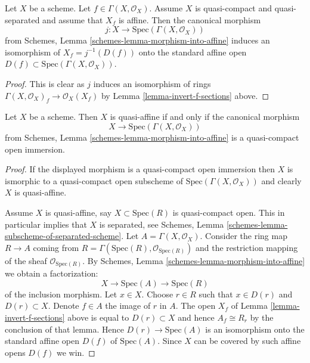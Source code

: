\begin{lemma}
\label{lemma-invert-f-affine}
Let $X$ be a scheme. Let $f \in \Gamma(X, \mathcal{O}_X)$.
Assume $X$ is quasi-compact and quasi-separated and assume that
$X_f$ is affine. Then the canonical morphism
$$
j : X \longrightarrow \text{Spec}(\Gamma(X, \mathcal{O}_X))
$$
from Schemes, Lemma \ref{schemes-lemma-morphism-into-affine}
induces an isomorphism of $X_f = j^{-1}(D(f))$ onto the standard affine
open $D(f) \subset \text{Spec}(\Gamma(X, \mathcal{O}_X))$.
\end{lemma}

\begin{proof}
This is clear as $j$ induces an isomorphism of rings
$\Gamma(X, \mathcal{O}_X)_f \to \mathcal{O}_X(X_f)$ by
Lemma \ref{lemma-invert-f-sections} above.
\end{proof}

\begin{lemma}
\label{lemma-quasi-affine}
Let $X$ be a scheme. Then $X$ is quasi-affine if and only if
the canonical morphism
$$
X \longrightarrow \text{Spec}(\Gamma(X, \mathcal{O}_X))
$$
from Schemes, Lemma \ref{schemes-lemma-morphism-into-affine} is
a quasi-compact open immersion.
\end{lemma}

\begin{proof}
If the displayed morphism is a quasi-compact open immersion then
$X$ is ismorphic to a quasi-compact open subscheme of
$\text{Spec}(\Gamma(X, \mathcal{O}_X))$ and clearly $X$ is quasi-affine.

\medskip\noindent
Assume $X$ is quasi-affine, say $X \subset \text{Spec}(R)$ is
quasi-compact open. This in particular implies that $X$ is
separated, see
Schemes, Lemma \ref{schemes-lemma-subscheme-of-separated-scheme}.
Let $A = \Gamma(X, \mathcal{O}_X)$.
Consider the ring map $R \to A$ coming from
$R = \Gamma(\text{Spec}(R), \mathcal{O}_{\text{Spec}(R)})$
and the restriction mapping of the sheaf $\mathcal{O}_{\text{Spec}(R)}$.
By Schemes, Lemma \ref{schemes-lemma-morphism-into-affine}
we obtain a factorization:
$$
X \longrightarrow
\text{Spec}(A) \longrightarrow
\text{Spec}(R)
$$
of the inclusion morphism. Let $x \in X$. Choose $r \in R$ such that
$x \in D(r)$ and $D(r) \subset X$. Denote $f \in A$ the image of $r$
in $A$. The open $X_f$ of Lemma \ref{lemma-invert-f-sections}
above is equal to $D(r) \subset X$ and hence $A_f \cong R_r$ by the
conclusion of that lemma.
Hence $D(r) \to \text{Spec}(A)$ is an isomorphism onto the
standard affine open $D(f)$ of $\text{Spec}(A)$. Since $X$
can be covered by such affine opens $D(f)$ we win.
\end{proof}









